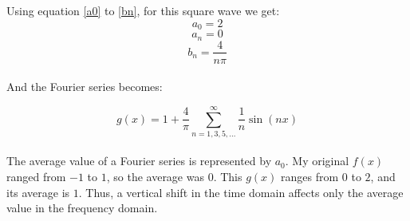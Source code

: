 \documentclass{article}
\begin{document}
Using equation \ref{a0} to \ref{bn}, for this square wave we get:
    \begin{equation}
    a_0 = 2
    \end{equation}
    \begin{equation}
    a_n = 0
    \end{equation}
    \begin{equation}
    b_n = \frac{4}{n\pi}
    \end{equation}\\
And the Fourier series becomes:

    \begin{equation}
g(x) = 1 + \frac{4}{\pi} \sum_{n=1,3,5,...}^{\infty} \frac{1}{n} \sin\left(nx\right)
    \end{equation}\\
The average value of a Fourier series is represented by $a_0$. My original $f(x)$ ranged from
   $-1$ to $1$, so the average was $0$. This $g(x)$ ranges from $0$ to $2$, and its average is $1$. Thus, a vertical shift in the time domain affects only the average value in the frequency domain. 
\end{document}
